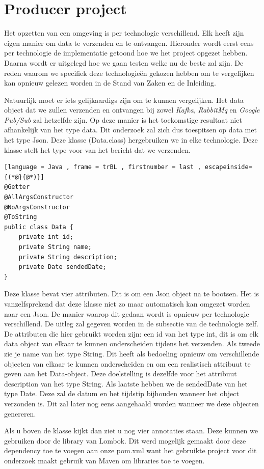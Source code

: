 \section{Producer project}
Het opzetten van een omgeving is per technologie verschillend. Elk heeft zijn eigen manier om data te verzenden en te ontvangen. Hieronder wordt eerst eens per technologie de implementatie getoond hoe we het project opgezet hebben. Daarna wordt er uitgelegd hoe we gaan testen welke nu de beste zal zijn. De reden waarom we specifiek deze technologieën gekozen hebben om te vergelijken kan opnieuw gelezen worden in de Stand van Zaken en de Inleiding.  

Natuurlijk moet er iets gelijkaardigs zijn om te kunnen vergelijken. Het data object dat we zullen verzenden en ontvangen bij zowel \emph{Kafka}, \emph{RabbitMq} en \emph{Google Pub/Sub} zal hetzelfde zijn. Op deze manier is het toekomstige resultaat niet afhankelijk van het type data. Dit onderzoek zal zich dus toespitsen op data met het type Json. Deze klasse (Data.class) hergebruiken we in elke technologie. Deze klasse stelt het type voor van het bericht dat we verzenden.
\begin{lstlisting}[language = Java , frame = trBL , firstnumber = last , escapeinside={(*@}{@*)}]
@Getter
@AllArgsConstructor
@NoArgsConstructor
@ToString
public class Data {
    private int id;
    private String name;
    private String description;
    private Date sendedDate;
}
     \end{lstlisting}
     
Deze klasse bevat vier attributen. Dit is om een Json object na te bootsen. Het is vanzelfsprekend dat deze klasse niet zo maar automatisch kan omgezet worden naar een Json. De manier waarop dit gedaan wordt is opnieuw per technologie verschillend. De uitleg zal gegeven worden in de subsectie van de technologie zelf. De attributen die hier gebruikt worden zijn: een id van het type int, dit is om elk data object van elkaar te kunnen onderscheiden tijdens het verzenden. Als tweede zie je name van het type String. Dit heeft als bedoeling opnieuw om verschillende objecten van elkaar te kunnen onderscheiden en om een realistisch attribuut te geven aan het Data-object. Deze doelstelling is dezelfde voor het attribuut description van het type String. Als laatste hebben we de sendedDate van het type Date. Deze zal de datum en het tijdstip bijhouden wanneer het object verzonden is. Dit zal later nog eens aangehaald worden wanneer we deze objecten genereren. 

Als u boven de klasse kijkt dan ziet u nog vier annotaties staan. Deze kunnen we gebruiken door de library van Lombok. Dit werd mogelijk gemaakt door deze dependency toe te voegen aan onze pom.xml want het gebruikte project voor dit onderzoek maakt gebruik van Maven om libraries toe te voegen.

